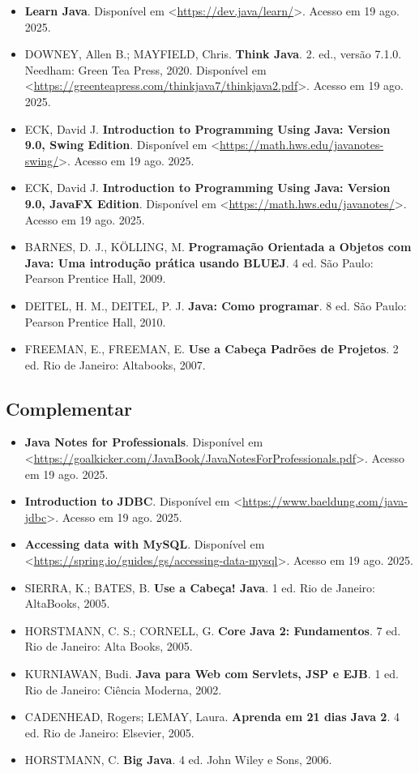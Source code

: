 \documentclass[a4paper, 12pt]{article}
\begin{document}
\begin{itemize}
    \item \textbf{Learn Java}. Disponível em <\url{https://dev.java/learn/}>. Acesso em 19 ago. 2025.
    \item DOWNEY, Allen B.; MAYFIELD, Chris. \textbf{Think Java}. 2. ed., versão 7.1.0. Needham: Green Tea Press, 2020. Disponível em <\url{https://greenteapress.com/thinkjava7/thinkjava2.pdf}>. Acesso em 19 ago. 2025.
    \item ECK, David J. \textbf{Introduction to Programming Using Java: Version 9.0, Swing Edition}. Disponível em <\url{https://math.hws.edu/javanotes-swing/}>. Acesso em 19 ago. 2025.
    \item ECK, David J. \textbf{Introduction to Programming Using Java: Version 9.0, JavaFX Edition}. Disponível em <\url{https://math.hws.edu/javanotes/}>. Acesso em 19 ago. 2025.
    \item BARNES, D. J., KÖLLING, M. \textbf{Programação Orientada a Objetos com Java: Uma introdução prática usando BLUEJ}. 4 ed. São Paulo: Pearson Prentice Hall, 2009.
    \item DEITEL, H. M., DEITEL, P. J. \textbf{Java: Como programar}. 8 ed. São Paulo: Pearson Prentice Hall, 2010.
    \item FREEMAN, E., FREEMAN, E. \textbf{Use a Cabeça Padrões de Projetos}. 2 ed. Rio de Janeiro: Altabooks, 2007.
\end{itemize}

\subsection{Complementar}

\begin{itemize}
    \item \textbf{Java Notes for Professionals}. Disponível em <\url{https://goalkicker.com/JavaBook/JavaNotesForProfessionals.pdf}>. Acesso em 19 ago. 2025.
    \item \textbf{Introduction to JDBC}. Disponível em <\url{https://www.baeldung.com/java-jdbc}>. Acesso em 19 ago. 2025.
    \item \textbf{Accessing data with MySQL}. Disponível em\\ <\url{https://spring.io/guides/gs/accessing-data-mysql}>. Acesso em 19 ago. 2025.
    \item SIERRA, K.; BATES, B. \textbf{Use a Cabeça! Java}. 1 ed. Rio de Janeiro: AltaBooks, 2005.
    \item HORSTMANN, C. S.; CORNELL, G. \textbf{Core Java 2: Fundamentos}. 7 ed. Rio de Janeiro: Alta Books, 2005.
    \item KURNIAWAN, Budi. \textbf{Java para Web com Servlets, JSP e EJB}. 1 ed. Rio de Janeiro: Ciência Moderna, 2002.
    \item CADENHEAD, Rogers; LEMAY, Laura. \textbf{Aprenda em 21 dias Java 2}. 4 ed. Rio de Janeiro: Elsevier, 2005.
    \item HORSTMANN, C. \textbf{Big Java}. 4 ed. John Wiley e Sons, 2006.
\end{itemize}
\end{document}
